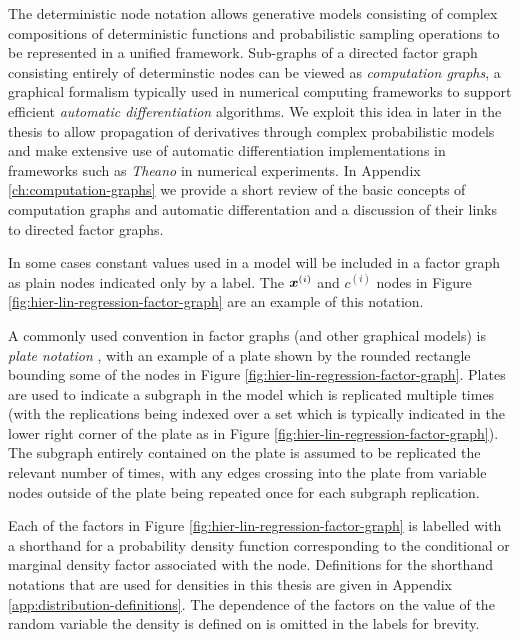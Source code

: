 The deterministic node notation allows generative models consisting of complex compositions of deterministic functions and probabilistic sampling operations to be represented in a unified framework. Sub-graphs of a directed factor graph consisting entirely of determinstic nodes can be viewed as \emph{computation graphs}, a graphical formalism typically used in numerical computing frameworks to support efficient \emph{automatic differentiation} algorithms. We exploit this idea in later in the thesis to allow propagation of derivatives through complex probabilistic models and make extensive use of automatic differentiation implementations in frameworks such as \emph{Theano} \citep{theano2016theano} in numerical experiments. In Appendix \ref{ch:computation-graphs} we provide a short review of the basic concepts of computation graphs and automatic differentation and a discussion of their links to directed factor graphs.

In some cases constant values used in a model will be included in a factor graph as plain nodes indicated only by a label. The $\boldsymbol{x}^{(i)}$ and $c^{(i)}$ nodes in Figure \ref{fig:hier-lin-regression-factor-graph} are an example of this notation.

A commonly used convention in factor graphs (and other graphical models) is \emph{plate notation} \citep{buntine1994operations}, with an example of a plate shown by the rounded rectangle bounding some of the nodes in Figure \ref{fig:hier-lin-regression-factor-graph}. Plates are used to indicate a subgraph in the model which is replicated multiple times (with the replications being indexed over a set which is typically indicated in the lower right corner of the plate as in Figure \ref{fig:hier-lin-regression-factor-graph}). The subgraph entirely contained on the plate is assumed to be replicated the relevant number of times, with any edges crossing into the plate from variable nodes outside of the plate being repeated once for each subgraph replication. %

Each of the factors in Figure \ref{fig:hier-lin-regression-factor-graph} is labelled with a shorthand for a probability density function corresponding to the conditional or marginal density factor associated with the node. Definitions for the shorthand notations that are used for densities in this thesis are given in Appendix \ref{app:distribution-definitions}. The dependence of the factors on the value of the random variable the density is defined on is omitted in the labels for brevity.


